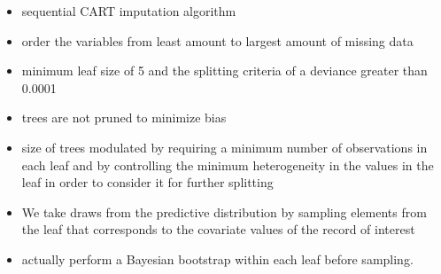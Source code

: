 \documentclass[20pt,margin=1in,innermargin=-4.5in,blockverticalspace=-0.25in]{tikzposter}
\begin{document}
\begin{columns}
{        \vspace{10mm}

        \begin{itemize}
            \item sequential CART imputation algorithm
            \item  order the variables from least amount to largest amount of missing data
            \item minimum leaf size of 5 and the splitting criteria of a deviance greater than 0.0001
            \item trees are not pruned to minimize bias
            \item size of trees modulated by requiring a minimum number of observations in each leaf and by controlling the minimum heterogeneity in the values in the leaf in order to consider it for further splitting     
            \item We take draws from the predictive distribution by sampling elements from the leaf that corresponds to the covariate values of the record of interest
            \item  actually perform a Bayesian bootstrap within each leaf before sampling.
        \end{itemize}
    }

\end{columns}
\end{document}
